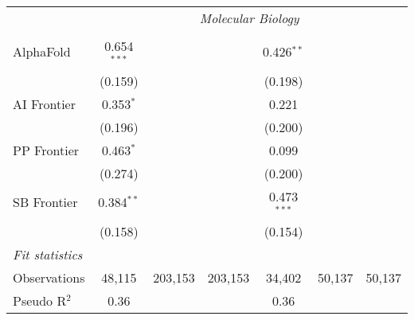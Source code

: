 \begin{tabular}{lcccccc}
 & \multicolumn{6}{c}{\textit{Molecular Biology}} \\ \\
   AlphaFold    & 0.654$^{***}$ &         &         & 0.426$^{**}$  &        &   \\   
                & (0.159)       &         &         & (0.198)       &        &   \\   
   AI Frontier  & 0.353$^{*}$   &         &         & 0.221         &        &   \\   
                & (0.196)       &         &         & (0.200)       &        &   \\   
   PP Frontier  & 0.463$^{*}$   &         &         & 0.099         &        &   \\   
                & (0.274)       &         &         & (0.200)       &        &   \\   
   SB Frontier  & 0.384$^{**}$  &         &         & 0.473$^{***}$ &        &   \\   
                & (0.158)       &         &         & (0.154)       &        &   \\   
   \midrule
   \emph{Fit statistics}\\
   Observations & 48,115        & 203,153 & 203,153 & 34,402        & 50,137 & 50,137\\  
   Pseudo R$^2$ & 0.36          &         &         & 0.36          &        & \\  
   

\end{tabular}
